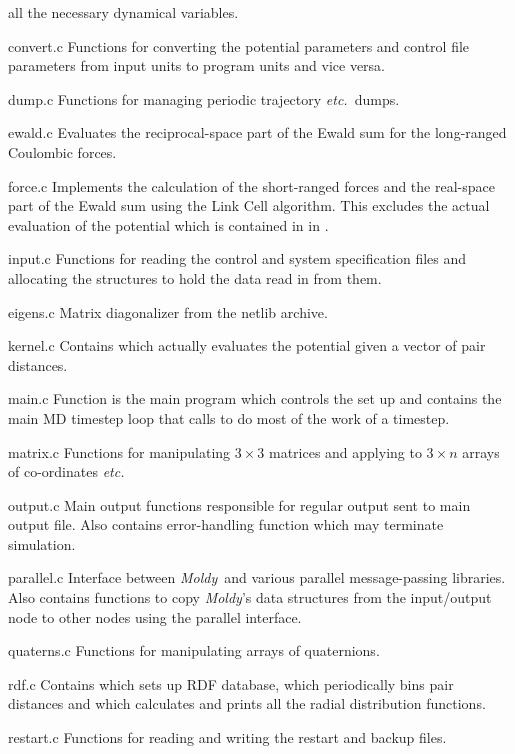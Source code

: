 \documentclass[a4paper,twoside]{report}
\newcommand{\moldy}{\emph{Moldy}}
\newcommand{\etc}{\emph{etc.}}
\begin{document}
\begin{Fndescription}
  all the necessary dynamical variables.
\item[convert.c] Functions for converting the potential parameters and
  control file parameters from input units to program units and vice
  versa. 
\item[dump.c] Functions for managing periodic trajectory \etc\ dumps.
\item[ewald.c] Evaluates the reciprocal-space part of the Ewald sum
  for the long-ranged Coulombic forces.
\item[force.c] Implements the calculation of the short-ranged forces
  and the real-space part of the Ewald sum using the Link Cell
  algorithm. This excludes the actual evaluation of the potential
  which is contained in  in .
\item[input.c] Functions for reading the control and system
  specification files and allocating the structures to hold the data
  read in from them. 
\item[eigens.c] Matrix diagonalizer from the netlib archive.
\item[kernel.c] Contains  which actually evaluates
  the potential given a vector of pair distances.
\item[main.c] Function  is the main program which
  controls the set up and contains the main MD timestep loop that 
  calls  to do most of the work of a timestep.
\item[matrix.c] Functions for manipulating $3 \times 3$ matrices and
  applying to $3 \times n$ arrays of co-ordinates \etc
\item[output.c] Main output functions responsible for regular output
  sent to main output file.  Also contains error-handling function
   which may terminate simulation.
\item[parallel.c] Interface between \moldy\ and various parallel
  message-passing libraries.  Also contains functions to copy \moldy's
  data structures from the input/output node to other nodes using the
  parallel interface.
\item[quaterns.c] Functions for manipulating arrays of quaternions.
\item[rdf.c] Contains  which sets up RDF database,
   which periodically bins pair distances and
   which calculates and prints all the radial
  distribution functions.
\item[restart.c] Functions for reading and writing the restart and
  backup files.

\end{Fndescription}
\end{document}
